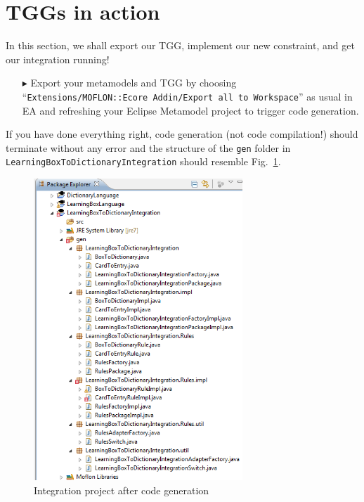\section{TGGs in action}
\label{sect:TGGs_in_Action}
In this section, we shall export our TGG, implement our new constraint, and get our integration running!
 
\begin{enumerate}
\item[$\blacktriangleright$] Export your metamodels and TGG by choosing ``\texttt{Extensions/\-MOFLON::\-Ecore Addin\-/Export all to Workspace}'' as usual in EA and refreshing your Eclipse Metamodel project to trigger code generation.
\end{enumerate}

If you have done everything right, code generation (not code compilation!) should terminate without any error and the structure of the \texttt{gen} folder in \texttt{LearningBox\-To\-Dictionary\-Integration} should resemble Fig.~\ref{fig:gen_folder}.

\begin{figure}[htbp]
\begin{center}
  \includegraphics[width=0.7\textwidth]{pics/tggBilder/transformation/tgg22}
  \caption{Integration project after code generation}  
  \label{fig:gen_folder}
\end{center}
\end{figure} 

